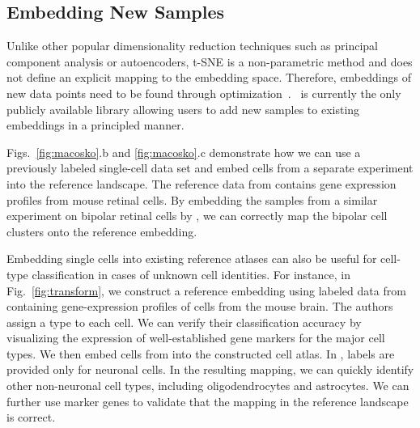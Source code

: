 \documentclass[article]{jss}
\newcommand{\opentsne}{\pkg{openTSNE}}
\begin{document}
\subsection{Embedding New Samples}

Unlike other popular dimensionality reduction techniques such as principal
component analysis or autoencoders, t-SNE is a non-parametric method and does
not define an explicit mapping to the embedding space. Therefore, embeddings of
new data points need to be found through
optimization~\citep{policar2021embedding}. \opentsne\ is currently the only
publicly available library allowing users to add new samples to existing
embeddings in a principled manner.

Figs.~\ref{fig:macosko}.b and \ref{fig:macosko}.c demonstrate how we can use a
previously labeled single-cell data set and embed cells from a separate
experiment into the reference landscape. The reference data from
\citet{macosko2015highly} contains gene expression
profiles from mouse retinal cells. By embedding the samples from a similar
experiment on bipolar retinal cells by \citet{shekhar2016comprehensive}, we can correctly map the bipolar cell
clusters onto the reference embedding.

Embedding single cells into existing reference atlases can also be useful for
cell-type classification in cases of unknown cell identities. For instance, in
Fig.~\ref{fig:transform}, we construct a reference embedding using labeled data
from \citet{hochgerner2018conserved} containing
gene-expression profiles of cells from the mouse brain. The authors assign a
type to each cell. We can verify their classification accuracy by visualizing
the expression of well-established gene markers for the major cell types. We
then embed cells from \citet{harris2018classes} into the
constructed cell atlas. In \citet{harris2018classes}, labels are provided only for
neuronal cells. In the resulting mapping, we can quickly identify other
non-neuronal cell types, including oligodendrocytes and astrocytes. We can
further use marker genes to validate that the mapping in the reference landscape
is correct. 
\end{document}
